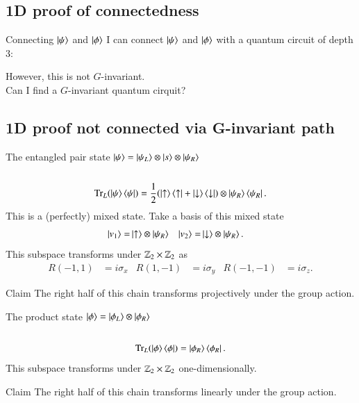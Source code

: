 \documentclass{beamer}
\begin{document}
\subsection{1D proof of connectedness}

\begin{frame}{Connecting $\ket{\psi}$ and $\ket{\phi}$}
	I can connect $\ket{\psi}$ and $\ket{\phi}$ with a quantum circuit of depth 3:
	\begin{center}
		\scalebox{0.75}{
		
		}
	\end{center}
	\pause
	However, this is not $G$-invariant.\\
	\pause
	Can I find a $G$-invariant quantum cirquit?
\end{frame}

\subsection{1D proof not connected via G-invariant path}

\begin{frame}{The entangled pair state}
	$\ket{\psi}=\ket{\psi_L}\otimes\ket{s}\otimes\ket{\psi_R}$ \\
	\\
	\pause
	\begin{equation*}
		\textrm{Tr}_L(\ket{\psi}\bra{\psi})=\frac{1}{2}(\ket{\uparrow}\bra{\uparrow}+\ket{\downarrow}\bra{\downarrow})\otimes\ket{\psi_R}\bra{\psi_R}.
	\end{equation*}
	This is a (perfectly) mixed state. Take a basis of this mixed state
	\begin{align*}
		\ket{v_1}=&\ket{\uparrow}\otimes\ket{\psi_R}&\ket{v_2}=&\ket{\downarrow}\otimes\ket{\psi_R}.
	\end{align*}
	\pause
	This subspace transforms under $\mathbb{Z}_2\times\mathbb{Z}_2$ as
	\begin{align*}
		R(-1,1)&=i\sigma_x&R(1,-1)&=i\sigma_y&R(-1,-1)&=i\sigma_z.
	\end{align*}
	\begin{block}{Claim}
		The right half of this chain transforms projectively under the group action.
	\end{block}
\end{frame}

\begin{frame}{The product state}
	$\ket{\phi}=\ket{\phi_{L}}\otimes\ket{\phi_{R}}$ \\
	\\
	\pause
	\begin{equation*}
		\textrm{Tr}_L(\ket{\phi}\bra{\phi})=\ket{\phi_{R}}\bra{\phi_{R}}.
	\end{equation*}
	\pause
	This subspace transforms under $\mathbb{Z}_2\times\mathbb{Z}_2$ one-dimensionally.
	\begin{block}{Claim}
		The right half of this chain transforms linearly under the group action.
	\end{block}
\end{frame}
\end{document}
